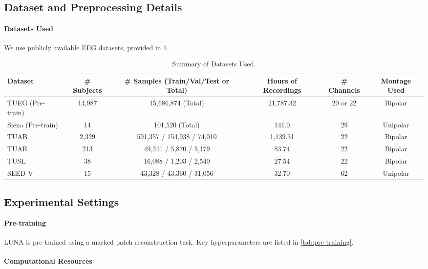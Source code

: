 \subsection{Dataset and Preprocessing Details}
\label{app:datasets}

\paragraph{Datasets Used}
We use publicly available EEG datasets,
provided in \ref{tab:app_dataset_summary}.

\begin{table}[htbp!]
\centering
\caption{Summary of Datasets Used.}
\label{tab:app_dataset_summary}
\resizebox{\columnwidth}{!} {
\begin{tabular}{@{}lccccc@{}}
\toprule
\textbf{Dataset} & \textbf{\# Subjects} & \textbf{\# Samples (Train/Val/Test or Total)} & \textbf{Hours of Recordings} & \textbf{\# Channels} & \textbf{Montage Used} \\
\midrule
TUEG (Pre-train) & 14,987 & 15,686,874 (Total) & 21,787.32 & 20 or 22 & Bipolar \\
Siena (Pre-train) & 14 & 101,520 (Total) & 141.0 & 29 & Unipolar \\
TUAB & 2,329 & 591,357 / 154,938 / 74,010 & 1,139.31 & 22 & Bipolar \\
TUAR & 213 & 49,241 / 5,870 / 5,179 & 83.74 & 22 & Bipolar \\
TUSL & 38 & 16,088 / 1,203 / 2,540 & 27.54 & 22 & Bipolar \\
SEED-V & 15 & 43,328 / 43,360 / 31,056 & 32.70 & 62 & Unipolar \\
\bottomrule
\end{tabular}}
\end{table}

\subsection{Experimental Settings}
\label{app:exp_settings}

\paragraph{Pre-training}
LUNA is pre-trained using a masked patch reconstruction task. Key hyperparameters are listed in \ref{tab:pre-training}.

\paragraph{Computational Resources}

